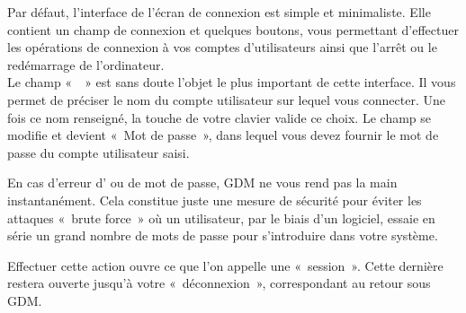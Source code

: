 Par défaut, l'interface de l'écran de connexion est simple et minimaliste. Elle contient un champ de connexion et quelques boutons, vous permettant d'effectuer les opérations de connexion à vos comptes d'utilisateurs ainsi que l'arrêt ou le redémarrage de l'ordinateur.\\ 
Le champ «~~» est sans doute l'objet le plus important de cette interface. Il vous permet de préciser le nom du compte utilisateur sur lequel vous connecter. Une fois ce nom renseigné, la touche  de votre clavier valide ce choix. Le champ se modifie et devient «~Mot de passe~», dans lequel vous devez fournir le mot de passe du compte utilisateur saisi.\par
\begin{nota}
En cas d'erreur d' ou de mot de passe, GDM ne vous rend pas la main instantanément. Cela constitue juste une mesure de sécurité pour éviter les attaques «~brute force~» où un utilisateur, par le biais d'un logiciel, essaie en série un grand nombre de mots de passe pour s'introduire dans votre système.
\end{nota}
Effectuer cette action ouvre ce que l'on appelle une «~session~». Cette dernière restera ouverte jusqu'à votre «~déconnexion~», correspondant au retour sous GDM.
